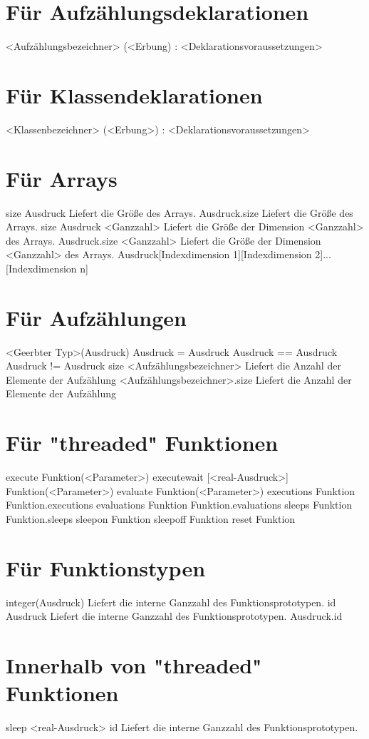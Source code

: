 \section{Für Aufzählungsdeklarationen}
<Aufzählungsbezeichner> (<Erbung) : <Deklarationsvoraussetzungen>

\section{Für Klassendeklarationen}
<Klassenbezeichner> (<Erbung>) : <Deklarationsvoraussetzungen>

\section{Für Arrays}
size Ausdruck					Liefert die Größe des Arrays.
Ausdruck.size					Liefert die Größe des Arrays.
size Ausdruck <Ganzzahl>			Liefert die Größe der Dimension <Ganzzahl> des Arrays.
Ausdruck.size <Ganzzahl>			Liefert die Größe der Dimension <Ganzzahl> des Arrays.
Ausdruck[Indexdimension 1][Indexdimension 2]...[Indexdimension n]

\section{Für Aufzählungen}
<Geerbter Typ>(Ausdruck)
Ausdruck = Ausdruck
Ausdruck == Ausdruck
Ausdruck != Ausdruck
size <Aufzählungsbezeichner>			Liefert die Anzahl der Elemente der Aufzählung
<Aufzählungsbezeichner>.size			Liefert die Anzahl der Elemente der Aufzählung

\section{Für "threaded" Funktionen}
execute Funktion(<Parameter>)
executewait [<real-Ausdruck>] Funktion(<Parameter>)
evaluate Funktion(<Parameter>)
executions Funktion
Funktion.executions
evaluations Funktion
Funktion.evaluations
sleeps Funktion
Funktion.sleeps
sleepon Funktion
sleepoff Funktion
reset Funktion

\section{Für Funktionstypen}
integer(Ausdruck)				Liefert die interne Ganzzahl des Funktionsprototypen.
id Ausdruck					Liefert die interne Ganzzahl des Funktionsprototypen.
Ausdruck.id

\section{Innerhalb von "threaded" Funktionen}
sleep <real-Ausdruck>
id						Liefert die interne Ganzzahl des Funktionsprototypen.

